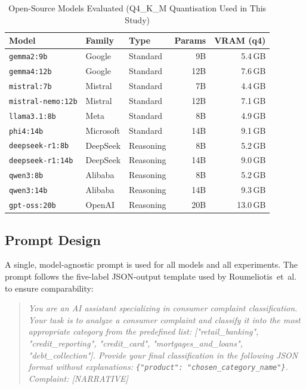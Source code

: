 \documentclass[journal]{IEEEtran}
\begin{document}
\begin{table}[!t]
  \renewcommand{\arraystretch}{1.2}
  \caption{Open-Source Models Evaluated (Q4\_K\_M Quantisation Used in This Study)}
  \label{tab:models}
  \centering
  \footnotesize
  \setlength{\tabcolsep}{3pt}
  \begin{tabular}{@{}lllrr@{}}
    \toprule
    \textbf{Model} & \textbf{Family} & \textbf{Type} & \textbf{Params} & \textbf{VRAM (q4)} \\
    \midrule
    \texttt{gemma2:9b}         & Google     & Standard  & 9B   & 5.4\,GB \\
    \texttt{gemma4:12b}        & Google     & Standard  & 12B  & 7.6\,GB \\
    \texttt{mistral:7b}        & Mistral    & Standard  & 7B   & 4.4\,GB \\
    \texttt{mistral-nemo:12b}  & Mistral    & Standard  & 12B  & 7.1\,GB \\
    \texttt{llama3.1:8b}       & Meta       & Standard  & 8B   & 4.9\,GB \\
    \texttt{phi4:14b}          & Microsoft  & Standard  & 14B  & 9.1\,GB \\
    \midrule
    \texttt{deepseek-r1:8b}    & DeepSeek   & Reasoning & 8B   & 5.2\,GB \\
    \texttt{deepseek-r1:14b}   & DeepSeek   & Reasoning & 14B  & 9.0\,GB \\
    \texttt{qwen3:8b}          & Alibaba    & Reasoning & 8B   & 5.2\,GB \\
    \texttt{qwen3:14b}         & Alibaba    & Reasoning & 14B  & 9.3\,GB \\
    \texttt{gpt-oss:20b}       & OpenAI     & Reasoning & 20B  & 13.0\,GB \\
    \bottomrule
  \end{tabular}
\end{table}

\subsection{Prompt Design}

A single, model-agnostic prompt is used for all models and all
experiments. The prompt follows the five-label JSON-output template
used by Roumeliotis~et~al.\ \cite{roumeliotis2025think} to ensure
comparability:

\begin{quote}
\textit{You are an AI assistant specializing in consumer complaint
classification. Your task is to analyze a consumer complaint and
classify it into the most appropriate category from the predefined
list: ["retail\_banking", "credit\_reporting", "credit\_card",
"mortgages\_and\_loans", "debt\_collection"]. Provide your final
classification in the following JSON format without explanations:
\texttt{\{"product": "chosen\_category\_name"\}}. Complaint: [NARRATIVE]}
\end{quote}
\end{document}
